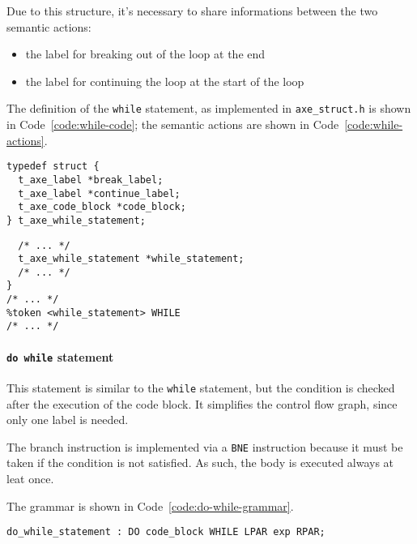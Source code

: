 Due to this structure, it's necessary to share informations between the two semantic actions:

\begin{itemize}
  \item the label for breaking out of the loop at the end
  \item the label for continuing the loop at the start of the loop
\end{itemize}

The definition of the \texttt{while} statement, as implemented in \texttt{axe\_struct.h} is shown in Code~\ref{code:while-code}; the semantic actions are shown in Code~\ref{code:while-actions}.

\begin{onepage}
  \begin{lstlisting}[language=LANCE, caption={Code for the while statement}, label={code:while-code}]
typedef struct {
  t_axe_label *break_label;
  t_axe_label *continue_label;
  t_axe_code_block *code_block;
} t_axe_while_statement;
\end{lstlisting}
\end{onepage}

\begin{onepage}
  \begin{lstlisting}[language=LANCE, caption={Semantic actions for the while statement}, label={code:while-actions}]
%union {
  /* ... */
  t_axe_while_statement *while_statement;
  /* ... */
}
/* ... */
%token <while_statement> WHILE
/* ... */
  \end{lstlisting}
\end{onepage}

\paragraph{\texttt{do while} statement}

This statement is similar to the \texttt{while} statement, but the condition is checked after the execution of the code block.
It simplifies the control flow graph, since only one label is needed.

The branch instruction is implemented via a \texttt{BNE} instruction because it must be taken if the condition is not satisfied.
As such, the body is executed always at leat once.

The grammar is shown in Code~\ref{code:do-while-grammar}.

\begin{onepage}
  \begin{lstlisting}[language=LANCE, caption={Grammar for the do while statement}, label={code:do-while-grammar}]
do_while_statement : DO code_block WHILE LPAR exp RPAR;
\end{lstlisting}
\end{onepage}